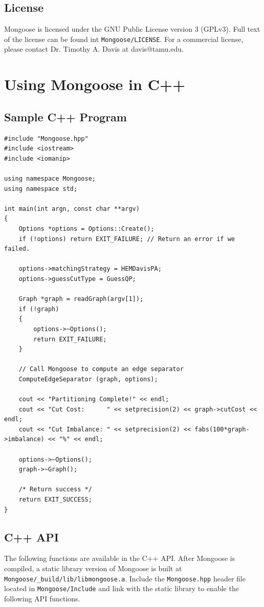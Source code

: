 \documentclass[letter]{article}
\begin{document}
\subsection{License}

Mongoose is licensed under the GNU Public License version 3 (GPLv3). Full text of the license can be found int \texttt{Mongoose/LICENSE}. For a commercial license, please contact Dr. Timothy A. Davis at davis@tamu.edu.

\section{Using Mongoose in C++}

\subsection{Sample C++ Program}

\begin{lstlisting}
#include "Mongoose.hpp"
#include <iostream>
#include <iomanip>

using namespace Mongoose;
using namespace std;

int main(int argn, const char **argv)
{
    Options *options = Options::Create();
    if (!options) return EXIT_FAILURE; // Return an error if we failed.

    options->matchingStrategy = HEMDavisPA;
    options->guessCutType = GuessQP;

    Graph *graph = readGraph(argv[1]);
    if (!graph)
    {
    	options->~Options();
    	return EXIT_FAILURE;
    }
	
    // Call Mongoose to compute an edge separator
    ComputeEdgeSeparator (graph, options);

    cout << "Partitioning Complete!" << endl;
    cout << "Cut Cost:      " << setprecision(2) << graph->cutCost << endl;
    cout << "Cut Imbalance: " << setprecision(2) << fabs(100*graph->imbalance) << "%" << endl;
	
	options->~Options();
    graph->~Graph();

    /* Return success */
    return EXIT_SUCCESS;
}
\end{lstlisting}

\subsection{C++ API}

The following functions are available in the C++ API. After Mongoose is compiled, a static library version of Mongoose is built at \texttt{Mongoose/\_build/lib/libmongoose.a}. Include the \texttt{Mongoose.hpp} header file located in \texttt{Mongoose/Include} and link with the static library to enable the following API functions.
\end{document}
